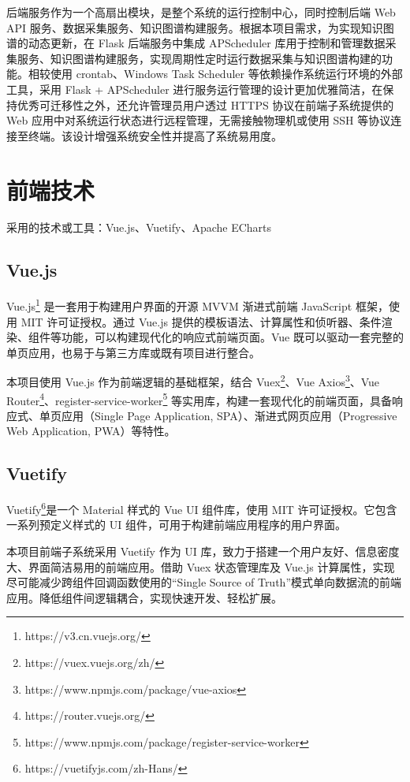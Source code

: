 \documentclass[a4paper,AutoFakeBold,oneside,12pt]{book}
\begin{document}
后端服务作为一个高扇出模块，是整个系统的运行控制中心，同时控制后端 Web API 服务、数据采集服务、知识图谱构建服务。根据本项目需求，为实现知识图谱的动态更新，在 Flask 后端服务中集成 APScheduler 库用于控制和管理数据采集服务、知识图谱构建服务，实现周期性定时运行数据采集与知识图谱构建的功能。相较使用 crontab、Windows Task Scheduler 等依赖操作系统运行环境的外部工具，采用 Flask + APScheduler 进行服务运行管理的设计更加优雅简洁，在保持优秀可迁移性之外，还允许管理员用户透过 HTTPS 协议在前端子系统提供的 Web 应用中对系统运行状态进行远程管理，无需接触物理机或使用 SSH 等协议连接至终端。该设计增强系统安全性并提高了系统易用度。

\section{前端技术}

采用的技术或工具：Vue.js、Vuetify、Apache ECharts

\subsection{Vue.js}

Vue.js\footnote{https://v3.cn.vuejs.org/} 是一套用于构建用户界面的开源 MVVM 渐进式前端 JavaScript 框架，使用 MIT 许可证授权。通过 Vue.js 提供的模板语法、计算属性和侦听器、条件渲染、组件等功能，可以构建现代化的响应式前端页面。Vue 既可以驱动一套完整的单页应用，也易于与第三方库或既有项目进行整合。

本项目使用 Vue.js 作为前端逻辑的基础框架，结合 Vuex\footnote{https://vuex.vuejs.org/zh/}、Vue Axios\footnote{https://www.npmjs.com/package/vue-axios}、Vue Router\footnote{https://router.vuejs.org/}、register-service-worker\footnote{https://www.npmjs.com/package/register-service-worker} 等实用库，构建一套现代化的前端页面，具备响应式、单页应用（Single Page Application, SPA）、渐进式网页应用（Progressive Web Application, PWA）等特性。

\subsection{Vuetify}

Vuetify\footnote{https://vuetifyjs.com/zh-Hans/}是一个 Material 样式的 Vue UI 组件库，使用 MIT 许可证授权。它包含一系列预定义样式的 UI 组件，可用于构建前端应用程序的用户界面。

本项目前端子系统采用 Vuetify 作为 UI 库，致力于搭建一个用户友好、信息密度大、界面简洁易用的前端应用。借助 Vuex 状态管理库及 Vue.js 计算属性，实现尽可能减少跨组件回调函数使用的“Single Source of Truth”模式单向数据流的前端应用。降低组件间逻辑耦合，实现快速开发、轻松扩展。
\end{document}
